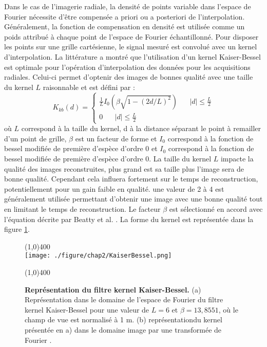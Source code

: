Dans le cas de l'imagerie radiale, la densité de points variable dans l'espace de Fourier nécessite d'être compensée a priori ou a posteriori de l'interpolation. Généralement, la fonction de compensation en densité est utilisée comme un poids attribué à chaque point de l'espace de Fourier échantillonné. Pour disposer les points sur une grille cartésienne, le signal mesuré est convolué avec un kernel d'interpolation. La littérature a montré que l'utilisation d'un kernel Kaiser-Bessel est optimale pour l'opération d'interpolation des données pour les acquisitions radiales. Celui-ci permet d'optenir des images de bonnes qualité avec une taille du kernel $L$ raisonnable et est défini par :
\begin{equation}
  K_{kb}(d) = \left\{
      \begin{aligned}
         \frac{1}{L}I_0(\beta \sqrt{1-(2d/L)^2}) \;\;\;\;\;\;  |d| \leq \frac{L}{2}\\
	     0 \;\;\;\;\;\; |d| \leq \frac{L}{2}
      \end{aligned}
    \right.
\end{equation}
où $L$ correspond à la taille du kernel, d à la distance séparant le point à remailler d'un point de grille, $\beta$ est un facteur de forme et $I_0$ correspond à la fonction de bessel modifiée de première d'espèce d'ordre 0 et $I_0$ correspond à la fonction de bessel modifiée de première d'espèce d'ordre 0.
La taille du kernel $L$ impacte la qualité des images reconstruites, plus grand est sa taille plus l'image sera de bonne qualité. Cependant cela influera fortement sur le temps de reconstruction, potentiellement pour un gain faible en qualité. une valeur de 2 à 4 est généralement utilisée permettant d'obtenir une image avec une bonne qualité tout en limitant le temps de reconstruction. Le facteur $\beta$ est sélectionné en accord avec l'équation décrite par Beatty et al. \cite{Beatty:2005fk}. La forme du kernel est représentée dans la figure \ref{fig:KaiserBessel}.
\begin{figure}[H]
\centering
\line(1,0){400} \\
\texttt{[image: ./figure/chap2/KaiserBessel.png]}
\caption[Représentation du filtre kernel Kaiser-Bessel.]{\label{fig:KaiserBessel} \textbf{Représentation du filtre kernel Kaiser-Bessel.} (a) Représentation dans le domaine de l'espace de Fourier du filtre kernel Kaiser-Bessel pour une valeur de $L = 6$ et $\beta = 13,8551$, où le champ de vue est normalisé à 1 m. (b) représentationdu kernel présentée en a) dans le domaine image par une transformée de Fourier .}
\line(1,0){400} \\
\end{figure}

